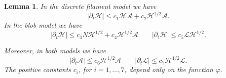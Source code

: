 \documentclass[a4paper,11pt]{article}
\numberwithin{equation}{section}
\newtheorem{lemma}{Lemma}
\begin{document}
\begin{lemma}
\label{lemma:H-bounds}
In the discrete filament model we have
\begin{equation*}%
  |\partial_t \mathcal{H}| \le c_1 \mathcal{H} \mathcal{A} + c_2
  \mathcal{H}^{1/2} \mathcal{A}. 
\end{equation*}
In the blob model we have
\begin{equation}\label{eq:energy-bound-blob}
  |\partial_t \mathcal{H}| \le  c_3 N \mathcal{H}^{1/2} + c_4
  \mathcal{H}^{1/2} \mathcal{A}
\qquad
  |\partial_t \mathcal{H}| \le  c_5 \mathcal{L} \mathcal{H}^{1/2}. 
\end{equation}

Moreover, in both models we have
\begin{equation*}%
 |\partial_t \mathcal{A}| \le c_6 \mathcal{H}^{1/2}  \mathcal{A} 
\qquad
 |\partial_t \mathcal{L}| \le c_7 \mathcal{H}^{1/2}  \mathcal{L}. 
\end{equation*}
The positive constants $c_i$, for $i=1,\dots,7$, depend only on the
function $\varphi$.
\end{lemma}
\end{document}

